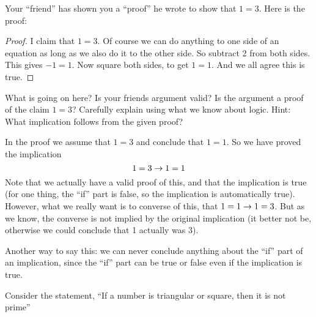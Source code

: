 \documentclass[10pt]{exam}
\begin{document}
\begin{questions}
  \question[4] Your ``friend'' has shown you a ``proof'' he wrote to show that $1 = 3$.  Here is the proof:

  \begin{proof}
  I claim that $1 = 3$.  Of course we can do anything to one side of an equation as long as we also do it to the other side.  So subtract 2 from both sides.  This gives $-1 = 1$.  Now square both sides, to get $1 = 1$.  And we all agree this is true.
  \end{proof}

  What is going on here?  Is your friends argument valid?  Is the argument a proof of the claim $1=3$?  Carefully explain using what we know about logic.  Hint: What implication follows from the given proof?

  \begin{solution}
  In the proof we assume that $1=3$ and conclude that $1=1$.  So we have proved the implication
  \[1=3 \rightarrow 1=1\]
  Note that we actually have a valid proof of this, and that the implication is true (for one thing, the ``if'' part is false, so the implication is automatically true).  However, what we really want is to converse of this, that $1=1 \rightarrow 1=3$.  But as we know, the converse is not implied by the original implication (it better not be, otherwise we could conclude that 1 actually was 3).

  Another way to say this: we can never conclude anything about the ``if'' part of an implication, since the ``if'' part can be true or false even if the implication is true.
  \end{solution}


  \question[6] Consider the statement, ``If a number is triangular or square, then it is not prime''


\end{questions}
\end{document}
